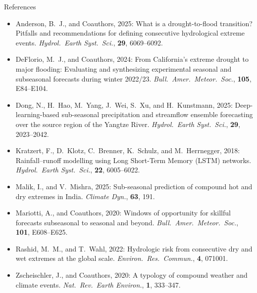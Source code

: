 \documentclass[aspectratio=169]{beamer}
\begin{document}
\appendix
\begin{frame}{References}

    \scriptsize
    \begin{itemize}\setlength{\itemsep}{0.45em}

    \item Anderson, B.~J., and Coauthors, 2025: What is a drought-to-flood transition? Pitfalls and recommendations for defining consecutive hydrological extreme events. \textit{Hydrol.\ Earth Syst.\ Sci.}, \textbf{29}, 6069--6092.

    \item DeFlorio, M.~J., and Coauthors, 2024: From California's extreme drought to major flooding: Evaluating and synthesizing experimental seasonal and subseasonal forecasts during winter 2022/23. \textit{Bull.\ Amer.\ Meteor.\ Soc.}, \textbf{105}, E84--E104.

    \item Dong, N., H.~Hao, M.~Yang, J.~Wei, S.~Xu, and H.~Kunstmann, 2025: Deep-learning-based sub-seasonal precipitation and streamflow ensemble forecasting over the source region of the Yangtze River. \textit{Hydrol.\ Earth Syst.\ Sci.}, \textbf{29}, 2023--2042.

    \item Kratzert, F., D.~Klotz, C.~Brenner, K.~Schulz, and M.~Herrnegger, 2018: Rainfall--runoff modelling using Long Short-Term Memory (LSTM) networks. \textit{Hydrol.\ Earth Syst.\ Sci.}, \textbf{22}, 6005--6022.

    \item Malik, I., and V.~Mishra, 2025: Sub-seasonal prediction of compound hot and dry extremes in India. \textit{Climate Dyn.}, \textbf{63}, 191.

    \item Mariotti, A., and Coauthors, 2020: Windows of opportunity for skillful forecasts subseasonal to seasonal and beyond. \textit{Bull.\ Amer.\ Meteor.\ Soc.}, \textbf{101}, E608--E625.

    \item Rashid, M.~M., and T.~Wahl, 2022: Hydrologic risk from consecutive dry and wet extremes at the global scale. \textit{Environ.\ Res.\ Commun.}, \textbf{4}, 071001.

    \item Zscheischler, J., and Coauthors, 2020: A typology of compound weather and climate events. \textit{Nat.\ Rev.\ Earth Environ.}, \textbf{1}, 333--347.

    \end{itemize}

\end{frame}
\end{document}
